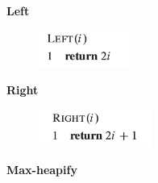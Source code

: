 \documentclass[12pt]{report}
\begin{document}
\begin{multicols}{2}

\par

{\fontsize{13pt}{15.6pt}\selectfont \textbf{Left}\par}\par




\begin{figure}[H]
	\begin{Center}
		\includegraphics[width=1.18in,height=0.48in]{./media/image94.png}
	\end{Center}
\end{figure}



\par

{\fontsize{13pt}{15.6pt}\selectfont \textbf{Right }\par}\par




\begin{figure}[H]
	\begin{Center}
		\includegraphics[width=1.46in,height=0.49in]{./media/image95.png}
	\end{Center}
\end{figure}



\par


\vspace{\baselineskip}

\vspace{\baselineskip}

\vspace{\baselineskip}

\end{multicols}
\textbf{Max-heapify}\par
\end{document}
